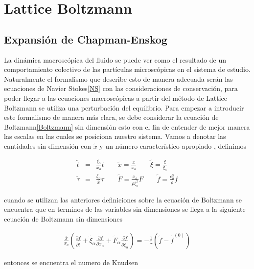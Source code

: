 \chapter{Lattice Boltzmann}



\section{Expansión de Chapman-Enskog}

\noindent La dinámica macroscópica del fluido se puede ver como el resultado de un comportamiento colectivo de las partículas microscópicas en el sistema de estudio. Naturalmente el formalismo que describe esto de manera adecuada serán las ecuaciones de Navier Stokes\eqref{NS} con las consideraciones de conservación, para poder llegar a las ecuaciones macroscópicas a partir del método de Lattice Boltzmann se utiliza una perturbación del equilibrio. Para empezar a introducir este formalismo de manera más clara, se debe considerar la ecuación de Boltzmann\eqref{Boltzmann} sin dimensión  esto con el fin de entender de mejor manera las escalas en las cuales se posiciona nuestro sistema. Vamos a denotar las cantidades sin dimensión con $\widetilde{x}$ y un número característico apropiado , definimos

\begin{eqnarray}
\widetilde{t} &=& \frac{\xi_{o}}{x_{o}} t \qquad \widetilde{x} = \frac{x}{x_{o}}\qquad \widetilde{\xi}=\frac{\xi}{\xi_{o}}\nonumber\\
\widetilde{\tau} &=& \frac{\xi_{o}}{\overline{x}}\tau\qquad \widetilde{F} = \frac{x_{o}}{\rho\xi_{o}^{2}}F\qquad \widetilde{f} = \frac{c_{o}^{3}}{\rho}f
\end{eqnarray}

\noindent cuando se utilizan las anteriores definiciones sobre la ecuación de Boltzmann se encuentra que en terminos de las variables sin dimensiones se llega a la siguiente ecuación de Boltzmann sin dimensiones

\begin{eqnarray}
\frac{\overline{x}}{x_{o}}\left(\frac{\partial \widetilde{f}}{\partial \widetilde{t}}+\widetilde{\xi}_{\alpha}\frac{\partial \widetilde{f}}{\partial \widetilde{x}_{\alpha}}+\widetilde{F}_{\alpha}\frac{\partial \widetilde{f}}{\partial \widetilde{\xi}_{\alpha}}\right)=-\frac{1}{\widetilde{\tau}}\left(\widetilde{f}-\widetilde{f}^{(0)}\right)
\end{eqnarray}

\noindent entonces se encuentra el numero de Knudsen 

